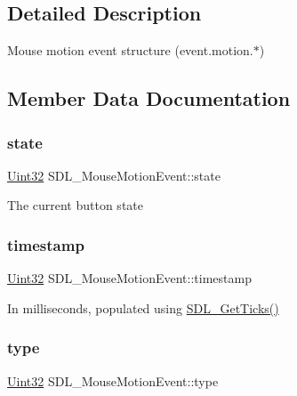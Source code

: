 \subsection{Detailed Description}
Mouse motion event structure (event.\+motion.$\ast$) 

\subsection{Member Data Documentation}
\mbox{\label{struct_s_d_l___mouse_motion_event_a3f6e9bad9d959b824881ba09e05b7024}} 
\subsubsection{\texorpdfstring{state}{state}}
{\footnotesize\ttfamily \mbox{\hyperlink{_s_d_l__stdinc_8h_add440eff171ea5f55cb00c4a9ab8672d}{Uint32}} S\+D\+L\+\_\+\+Mouse\+Motion\+Event\+::state}

The current button state \mbox{\label{struct_s_d_l___mouse_motion_event_af530bc0ef327ea6d497c5b1da119841c}} 
\subsubsection{\texorpdfstring{timestamp}{timestamp}}
{\footnotesize\ttfamily \mbox{\hyperlink{_s_d_l__stdinc_8h_add440eff171ea5f55cb00c4a9ab8672d}{Uint32}} S\+D\+L\+\_\+\+Mouse\+Motion\+Event\+::timestamp}

In milliseconds, populated using \mbox{\hyperlink{_s_d_l__timer_8h_a0b9bc71d6287e0ffafdc3419760fe2b3}{S\+D\+L\+\_\+\+Get\+Ticks()}} \mbox{\label{struct_s_d_l___mouse_motion_event_a431dd28cd6db6a7335cf633dbeb80cfb}} 
\subsubsection{\texorpdfstring{type}{type}}
{\footnotesize\ttfamily \mbox{\hyperlink{_s_d_l__stdinc_8h_add440eff171ea5f55cb00c4a9ab8672d}{Uint32}} S\+D\+L\+\_\+\+Mouse\+Motion\+Event\+::type}

